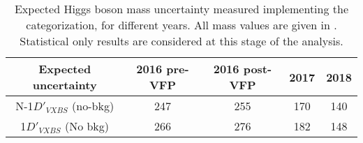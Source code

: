 \begin{table}[ht]	
\begin{center}
    \caption{Expected Higgs boson mass uncertainty measured implementing the categorization,
    for different years.
    All mass values are given in \MeV.  
    Statistical only results are considered at this stage of the analysis.
    }
    \begin{tabular}{ccccc} %
    \hline			
    Expected uncertainty	&	2016 pre-VFP	&	2016 post-VFP	&	2017	&	2018	\\
    \hline			
        N-1$D'_{VXBS}$ (no-bkg)	&	247	&	255	&	170	&	140	\\
        1$D'_{VXBS}$ (No bkg)	&	266	&	276	&	182	&	148	\\
    \hline
    \end{tabular}
    \label{table:2D_model_result_year}
\end{center}
\end{table}
